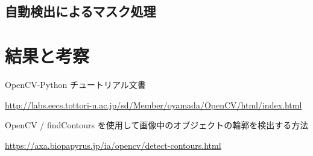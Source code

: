 \documentclass[dvipdfmx]{jsarticle}
\begin{document}
\subsection{自動検出によるマスク処理}




\section{結果と考察}



\begin{thebibliography}{10}
   OpenCV-Python チュートリアル文書
  
  \url{http://labs.eecs.tottori-u.ac.jp/sd/Member/oyamada/OpenCV/html/index.html}
  
   OpenCV / findContours を使用して画像中のオブジェクトの輪郭を検出する方法
  
  \url{https://axa.biopapyrus.jp/ia/opencv/detect-contours.html}
\end{thebibliography}
\end{document}

